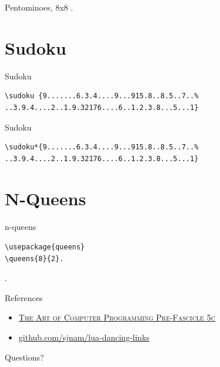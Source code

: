 \documentclass[xcolor=svgnames]{beamer}
\begin{document}
%
\begin{frame}{Pentominoes, 8x8}
.
\end{frame}


\section{Sudoku}

%
\begin{frame}[fragile]{Sudoku}
\begin{verbatim}
\sudoku {9.......6.3.4....9...915.8..8.5..7..%
..3.9.4....2..1.9.32176....6..1.2.3.8...5...1}
\end{verbatim}  
\begin{center}
\end{center}
\end{frame}

%
\begin{frame}[fragile]{Sudoku}
\begin{verbatim}
\sudoku*{9.......6.3.4....9...915.8..8.5..7..%
..3.9.4....2..1.9.32176....6..1.2.3.8...5...1}
\end{verbatim}
\begin{center}
\end{center}
\end{frame}


\section{N-Queens}

%
\begin{frame}[fragile]{n-queens}
\begin{verbatim}
\usepackage{queens}
\queens{8}{2}.
\end{verbatim}
\vspace{-10mm}
.
\end{frame}


%
\begin{frame}{References}
  \begin{itemize}
  \item \href{http://www-cs-faculty.stanford.edu/~knuth/fasc5c.ps.gz}
    {\textsc{The Art of Computer Programming Pre-Fascicle 5c}}
  \item \href{https://github.com/sjnam/lua-dancing-links}
    {github.com/sjnam/lua-dancing-links}
  \end{itemize}
\end{frame}

%
\begin{frame}[standout]
  Questions?
\end{frame}
\end{document}
